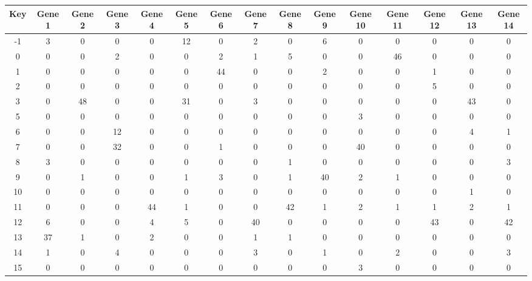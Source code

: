 \begin{tabular}{|c|c|c|c|c|c|c|c|c|c|c|c|c|c|c|}
\hline
Key & Gene 1 & Gene 2 & Gene 3 & Gene 4 & Gene 5 & Gene 6 & Gene 7 & Gene 8 & Gene 9 & Gene 10 & Gene 11 & Gene 12 & Gene 13 & Gene 14 \\
\hline
-1 & 3 & 0 & 0 & 0 & 12 & 0 & 2 & 0 & 6 & 0 & 0 & 0 & 0 & 0 \\
0 & 0 & 0 & 2 & 0 & 0 & 2 & 1 & 5 & 0 & 0 & 46 & 0 & 0 & 0 \\
1 & 0 & 0 & 0 & 0 & 0 & 44 & 0 & 0 & 2 & 0 & 0 & 1 & 0 & 0 \\
2 & 0 & 0 & 0 & 0 & 0 & 0 & 0 & 0 & 0 & 0 & 0 & 5 & 0 & 0 \\
3 & 0 & 48 & 0 & 0 & 31 & 0 & 3 & 0 & 0 & 0 & 0 & 0 & 43 & 0 \\
5 & 0 & 0 & 0 & 0 & 0 & 0 & 0 & 0 & 0 & 3 & 0 & 0 & 0 & 0 \\
6 & 0 & 0 & 12 & 0 & 0 & 0 & 0 & 0 & 0 & 0 & 0 & 0 & 4 & 1 \\
7 & 0 & 0 & 32 & 0 & 0 & 1 & 0 & 0 & 0 & 40 & 0 & 0 & 0 & 0 \\
8 & 3 & 0 & 0 & 0 & 0 & 0 & 0 & 1 & 0 & 0 & 0 & 0 & 0 & 3 \\
9 & 0 & 1 & 0 & 0 & 1 & 3 & 0 & 1 & 40 & 2 & 1 & 0 & 0 & 0 \\
10 & 0 & 0 & 0 & 0 & 0 & 0 & 0 & 0 & 0 & 0 & 0 & 0 & 1 & 0 \\
11 & 0 & 0 & 0 & 44 & 1 & 0 & 0 & 42 & 1 & 2 & 1 & 1 & 2 & 1 \\
12 & 6 & 0 & 0 & 4 & 5 & 0 & 40 & 0 & 0 & 0 & 0 & 43 & 0 & 42 \\
13 & 37 & 1 & 0 & 2 & 0 & 0 & 1 & 1 & 0 & 0 & 0 & 0 & 0 & 0 \\
14 & 1 & 0 & 4 & 0 & 0 & 0 & 3 & 0 & 1 & 0 & 2 & 0 & 0 & 3 \\
15 & 0 & 0 & 0 & 0 & 0 & 0 & 0 & 0 & 0 & 3 & 0 & 0 & 0 & 0 \\
\hline
\end{tabular}